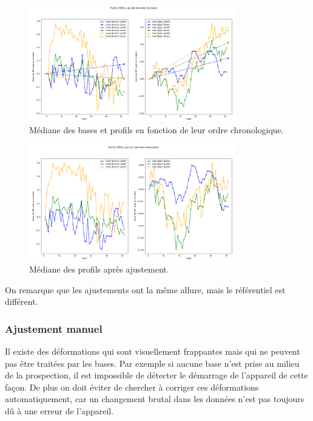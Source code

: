 \documentclass[12pt]{article}
\begin{document}
    \begin{figure}[ht!]
        \centering
        \includegraphics[width=0.8\textwidth]{Images/Base_diff_Avant_sq2.png}  
        \caption{Médiane des bases et profils en fonction de leur ordre chronologique.}
    \end{figure}

    \begin{figure}[ht!]
        \centering
        \includegraphics[width=0.8\textwidth]{Images/Base_diff_Apres_sq2.png}  
        \caption{Médiane des profils après ajustement.}
    \end{figure}

    On remarque que les ajustements ont la même allure, mais le référentiel est différent.

\subsubsection{Ajustement manuel}

    Il existe des déformations qui sont visuellement frappantes mais qui ne peuvent pas être traitées par les bases. Par exemple si aucune base n'est prise au milieu de la prospection, il est impossible de détecter le démarrage de l'appareil de cette façon. De plus on doit éviter de chercher à corriger ces déformations automatiquement, car un changement brutal dans les données n'est pas toujours dû à une erreur de l'appareil.
\end{document}
